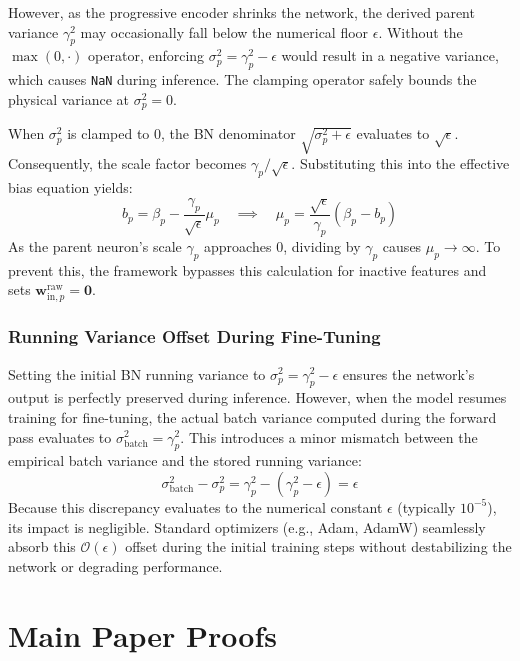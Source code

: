 \documentclass[11pt, a4paper, copyright, gdm]{google}
\newcommand{\wVect}{\boldsymbol{w}}
\newcommand{\zeroVect}{\boldsymbol{0}}
\newcommand{\calO}{\mathcal{O}}
\theoremstyle{definition}
\begin{document}
However, as the progressive encoder shrinks the network, the derived parent variance $\gamma_p^2$ may occasionally fall below the numerical floor $\epsilon$. Without the $\max(0, \cdot)$ operator, enforcing $\sigma_p^2 = \gamma_p^2 - \epsilon$ would result in a negative variance, which causes \texttt{NaN} during inference. The clamping operator safely bounds the physical variance at $\sigma_p^2 = 0$. 

When $\sigma_p^2$ is clamped to $0$, the BN denominator $\sqrt{\sigma_p^2 + \epsilon}$ evaluates to $\sqrt{\epsilon}$. Consequently, the scale factor becomes $\gamma_p / \sqrt{\epsilon}$. Substituting this into the effective bias equation yields:
\begin{equation}
    b_p = \beta_p - \frac{\gamma_p}{\sqrt{\epsilon}} \mu_p \quad \implies \quad \mu_p = \frac{\sqrt{\epsilon}}{\gamma_p} (\beta_p - b_p)
\end{equation}
As the parent neuron's scale $\gamma_p$ approaches $0$, dividing by $\gamma_p$ causes $\mu_p \rightarrow \infty$. To prevent this, the framework bypasses this calculation for inactive features and sets $\wVect_{\text{in},p}^{\text{raw}} = \zeroVect$.

\subsubsection{Running Variance Offset During Fine-Tuning}
Setting the initial BN running variance to $\sigma_p^2 = \gamma_p^2 - \epsilon$ ensures the network's output is perfectly preserved during inference. However, when the model resumes training for fine-tuning, the actual batch variance computed during the forward pass evaluates to $\sigma_{\text{batch}}^2 = \gamma_p^2$. This introduces a minor mismatch between the empirical batch variance and the stored running variance:
\begin{equation}
    \sigma_{\text{batch}}^2 - \sigma_p^2 = \gamma_p^2 - (\gamma_p^2 - \epsilon) = \epsilon
\end{equation}
Because this discrepancy evaluates to the numerical constant $\epsilon$ (typically $10^{-5}$), its impact is negligible. Standard optimizers (e.g., Adam, AdamW) seamlessly absorb this $\calO(\epsilon)$ offset during the initial training steps without destabilizing the network or degrading performance.

\section{Main Paper Proofs}
\end{document}
